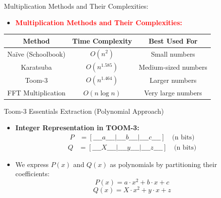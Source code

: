 \documentclass{beamer}
\begin{document}
\begin{frame}{Multiplication Methods and Their Complexities:}
\begin{itemize}
        \item \textbf{\textcolor{red}{Multiplication Methods and Their Complexities:}}
    \end{itemize}
     \begin{table}[]
        \centering
        \begin{tabular}{|c|c|c|}
            \hline
            \textbf{Method} & \textbf{Time Complexity} & \textbf{Best Used For} \\ \hline
            Naïve (Schoolbook) & $O(n^2)$ & Small numbers \\ \hline
            Karatsuba & $O(n^{1.585})$ & Medium-sized numbers \\ \hline
            Toom-3 & $O(n^{1.464})$ & Larger numbers \\ \hline
            FFT Multiplication & $O(n \log n)$ & Very large numbers \\ \hline
        \end{tabular}    
        \end{table}
    
\end{frame}


\begin{frame}{Toom-3 Essentials Extraction (Polynomial Approach)}

    \begin{itemize}
        \item \textbf{Integer Representation in TOOM-3:}
        \begin{align*}
            P &= [\_\_\_\_a\_\_\_\_|\_\_\_\_b\_\_\_\_|\_\_\_\_c\_\_\_\_] \quad \text{(n bits)}
        \end{align*}
        \begin{align*}
            Q &= [\_\_\_\_X\_\_\_\_|\_\_\_\_y\_\_\_\_|\_\_\_\_z\_\_\_\_] \quad \text{(n bits)}
        \end{align*}
        \item We express $ P(x) $ and $ Q(x) $ as polynomials by partitioning their coefficients:
        \[
        P(x) = a \cdot x^2 + b \cdot x + c
        \]
        \[
        Q(x) = X \cdot x^2 + y \cdot x + z
        \]

        \end{itemize}
\end{frame}
\end{document}
